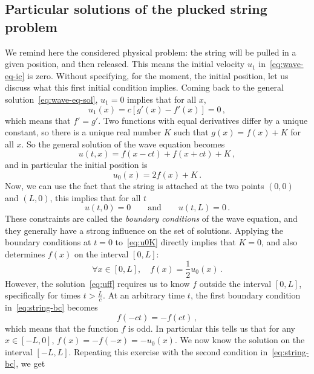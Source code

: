 \subsection{Particular solutions of the plucked string problem}
We remind here the considered physical problem: the string will be pulled in a given
position, and then released. This means the initial velocity $u_1$ in~\cref{eq:wave-eq-ic}
is zero. Without specifying, for the moment, the initial position, let us discuss what
this first initial condition implies. Coming back to the general
solution~\cref{eq:wave-eq-sol}, $u_1=0$ implies that for all $x$,
\begin{equation}
  u_1(x)=c[g'(x)-f'(x)]=0\,,
\end{equation}
which means that $f'=g'$. Two functions with equal derivatives differ by a unique
constant, so there is a unique real number $K$ such that $g(x)=f(x)+K$ for all $x$. So the
general solution of the wave equation becomes
\begin{equation}
  u(t,x)=f(x-ct)+f(x+ct)+K\,,\label{eq:uff}
\end{equation}
and in particular the initial position is
\begin{equation}
  u_0(x)=2f(x)+K\,.\label{eq:u0K}
\end{equation}
Now, we can use the fact that the string is attached at the two points $(0,0)$ and
$(L,0)$, this implies that for all $t$
\begin{equation}
  u(t,0)=0\qquad\text{and}\qquad u(t,L)=0\,.\label{eq:string-bc}
\end{equation}
These constraints are called the \emph{boundary conditions} of the wave equation, and they
generally have a strong influence on the set of solutions. Applying the boundary
conditions at $t=0$ to~\cref{eq:u0K} directly implies that $K=0$, and also determines
$f(x)$ on the interval $[0,L]$:
\begin{equation}
  \forall x\in[0,L],\quad f(x)=\frac{1}{2}u_0(x)\,.
\end{equation}
However, the solution~\cref{eq:uff} requires us to know $f$ outside the interval $[0,L]$,
specifically for times $t>\frac{L}{c}$. At an arbitrary time $t$, the first boundary
condition in~\cref{eq:string-bc} becomes
\begin{equation}
  f(-ct)=-f(ct)\,,
\end{equation}
which means that the function $f$ is odd. In particular this tells us that for any
$x\in[-L,0]$, $f(x)=-f(-x)=-u_0(x)$. We now know the solution on the interval $[-L,L]$.
Repeating this exercise with the second condition in~\cref{eq:string-bc}, we get
